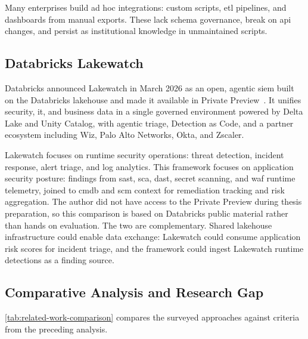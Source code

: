 Many enterprises build ad hoc integrations: custom scripts, \gls{etl} pipelines, and dashboards from manual exports. These lack schema governance, break on \gls{api} changes, and persist as institutional knowledge in unmaintained scripts.


\subsection{Databricks Lakewatch}
\label{sec:lakewatch}

Databricks announced Lakewatch in March 2026 as an open, agentic \gls{siem} built on the Databricks lakehouse and made it available in Private Preview~\cite{Databricks2026Lakewatch}. It unifies security, \gls{it}, and business data in a single governed environment powered by Delta Lake and Unity Catalog, with agentic triage, Detection as Code, and a partner ecosystem including Wiz, Palo Alto Networks, Okta, and Zscaler.

Lakewatch focuses on runtime security operations: threat detection, incident response, alert triage, and log analytics. This framework focuses on application security posture: findings from \gls{sast}, \gls{sca}, \gls{dast}, secret scanning, and \gls{waf} runtime telemetry, joined to \gls{cmdb} and \gls{scm} context for remediation tracking and risk aggregation. The author did not have access to the Private Preview during thesis preparation, so this comparison is based on Databricks public material rather than hands on evaluation. The two are complementary. Shared lakehouse infrastructure could enable data exchange: Lakewatch could consume application risk scores for incident triage, and the framework could ingest Lakewatch runtime detections as a finding source.


\subsection{Comparative Analysis and Research Gap}

\autoref{tab:related-work-comparison} compares the surveyed approaches against criteria from the preceding analysis.

